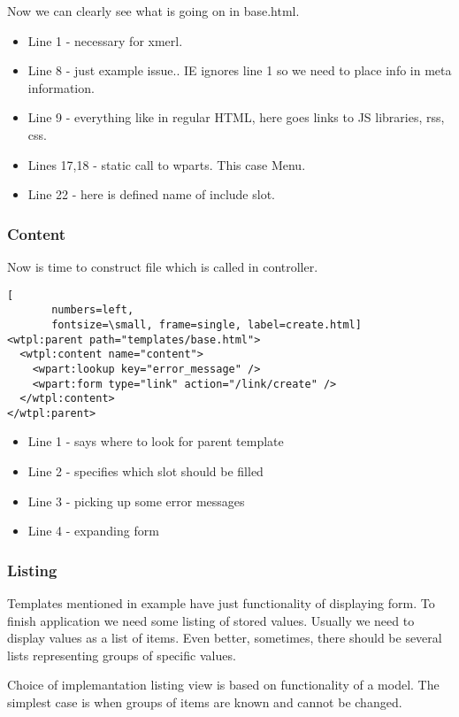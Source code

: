 Now we can clearly see what is going on in base.html. 
\\
\begin{itemize}
\item Line 1 - necessary for xmerl.
\item Line 8 - just example issue.. IE ignores line 1 so we need to place info
  in meta information.
\item Line 9 - everything like in regular HTML, here goes links to JS
  libraries, rss, css.
\item Lines 17,18 - static call to wparts. This case Menu.
\item Line 22 - here is defined name of include slot.  
\end{itemize}

\subsubsection{Content}
Now is time to construct file which is called in controller.
\\
\begin{Verbatim}[  
       numbers=left,
       fontsize=\small, frame=single, label=create.html]
<wtpl:parent path="templates/base.html">
  <wtpl:content name="content">
    <wpart:lookup key="error_message" />
    <wpart:form type="link" action="/link/create" />
  </wtpl:content>
</wtpl:parent>
\end{Verbatim}
\begin{itemize}
\item Line 1 - says where to look for parent template
\item Line 2 - specifies which slot should be filled
\item Line 3 - picking up some error messages
\item Line 4 - expanding form 
\end{itemize}

\subsubsection{Listing}
Templates mentioned in example have just functionality of displaying form. To
finish application we need some listing of stored values. Usually we need to
display values as a list of items. Even better, sometimes, there should be
several lists representing groups of specific values.

Choice of implemantation listing view is based on functionality of a model.
The simplest case is when groups of items are known and cannot be changed.

